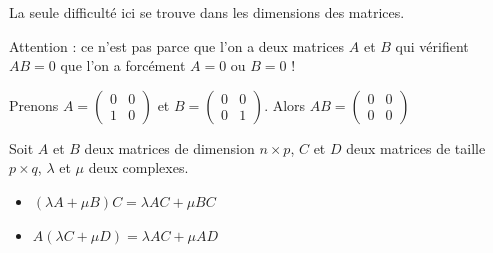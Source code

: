 \documentclass[11pt,fleqn]{book} %
\begin{document}
La seule difficulté ici se trouve dans les dimensions des matrices.

Attention : ce n'est pas parce que l'on a deux matrices $A$ et $B$ qui vérifient $AB=0$ que l'on a forcément $A=0$ ou $B=0$ !

\begin{example}Prenons $A=\begin{pmatrix}
0 & 0 \\ 1 & 0
\end{pmatrix}$ et $B=\begin{pmatrix}0 & 0 \\ 0 & 1\end{pmatrix}$. Alors $AB = \begin{pmatrix}
0 & 0 \\ 0 & 0
\end{pmatrix}$\end{example}

\begin{proposition}Soit $A$ et $B$ deux matrices de dimension $n \times p$, $C$ et $D$ deux matrices de taille $p \times q$, $\lambda$ et $\mu$ deux complexes.
\begin{itemize}
\item $(\lambda A + \mu B)C = \lambda AC + \mu BC$
\item $A(\lambda C + \mu D) = \lambda AC + \mu AD$\end{itemize}
\end{proposition}
\end{document}
